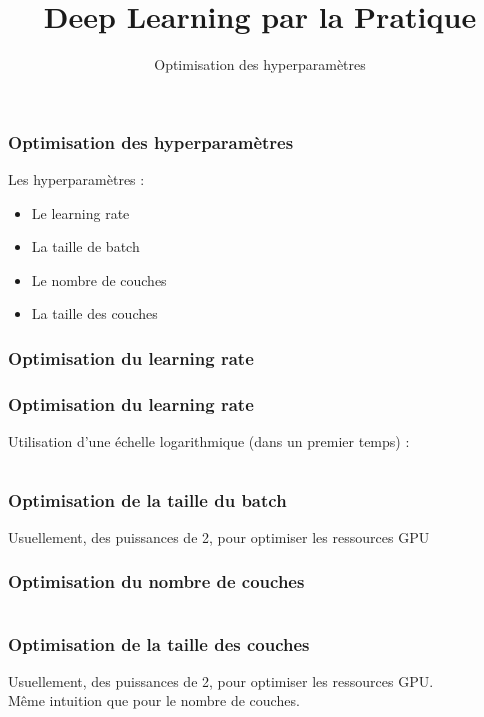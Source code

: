 \documentclass{formation}
\title{Deep Learning par la Pratique}
\subtitle{Optimisation des hyperparamètres}
\begin{document}
\maketitle

\begin{frame}
  \frametitle{Optimisation des hyperparamètres}
  \begin{minipage}[l]{0.49\linewidth}
  \end{minipage}\hfill
  \begin{minipage}[l]{0.49\linewidth}
  Les hyperparamètres :
  \begin{itemize}
  \item Le learning rate
  \item La taille de batch
  \item Le nombre de couches
  \item La taille des couches
  \end{itemize}
  \end{minipage}\hfill
\end{frame}

\begin{frame}
  \frametitle{Optimisation du learning rate}
\end{frame}

\begin{frame}
  \frametitle{Optimisation du learning rate}
  Utilisation d'une échelle logarithmique (dans un premier temps) :
  \inputminted[linenos,fontsize=\small,bgcolor=pythonbg]{python}{code-illustration/gridsearch-template.py}
\end{frame}

\begin{frame}
  \frametitle{Optimisation de la taille du batch}
  Usuellement, des puissances de 2, pour optimiser les ressources GPU
\end{frame}

\begin{frame}
  \frametitle{Optimisation du nombre de couches}
  \inputminted[linenos,fontsize=\small,bgcolor=pythonbg]{python}{code-illustration/addlayer-template.py}
\end{frame}

\begin{frame}
  \frametitle{Optimisation de la taille des couches}
  Usuellement, des puissances de 2, pour optimiser les ressources GPU. \\
  Même intuition que pour le nombre de couches.
\end{frame}
\end{document}
